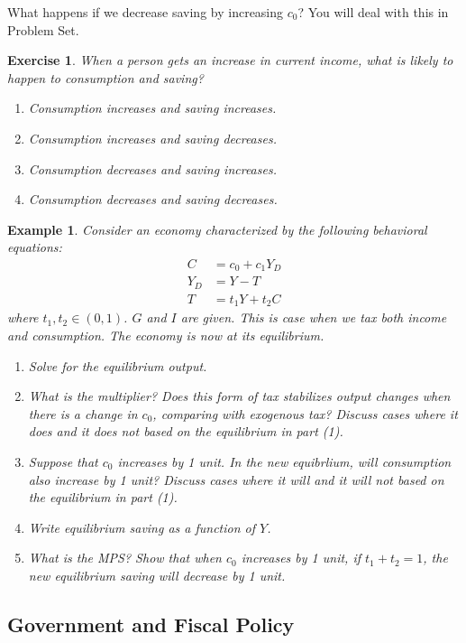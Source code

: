 \documentclass[12pt]{article}
\newtheorem{example}{Example}
\newtheorem{exercise}{Exercise}
\begin{document}
What happens if we decrease saving by increasing $c_0$? You will deal with this in Problem Set.

\begin{exercise}
    When a person gets an increase in current income, what is likely to happen to consumption and saving?
    \begin{enumerate}[label=\Alph*.]
        \item Consumption increases and saving increases.
        \item Consumption increases and saving decreases.
        \item Consumption decreases and saving increases.
        \item Consumption decreases and saving decreases.
    \end{enumerate}
\end{exercise}

\begin{example}
    Consider an economy characterized by the following behavioral equations:
    \begin{align*}
        C &= c_0 + c_1 Y_D\\
        Y_D &= Y - T\\
        T &= t_1 Y + t_2 C
    \end{align*}
    where $t_1, t_2 \in (0,1)$. $G$ and $I$ are given. This is case when we tax both income and consumption. The economy is now at its equilibrium.
    \begin{enumerate}[label=(\arabic*)]
        \item Solve for the equilibrium output.
        \item What is the multiplier? Does this form of tax stabilizes output changes when there is a change in $c_0$, comparing with exogenous tax? Discuss cases where it does and it does not based on the equilibrium in part (1).
        \item Suppose that $c_0$ increases by 1 unit. In the new equibrlium, will consumption also increase by 1 unit? Discuss cases where it will and it will not based on the equilibrium in part (1).
        \item Write equilibrium saving as a function of $Y$.
        \item What is the MPS? Show that when $c_0$ increases by 1 unit, if $t_1+t_2=1$, the new equilibrium saving will decrease by 1 unit.
    \end{enumerate} 
\end{example}

\subsection*{Government and Fiscal Policy}
\end{document}
